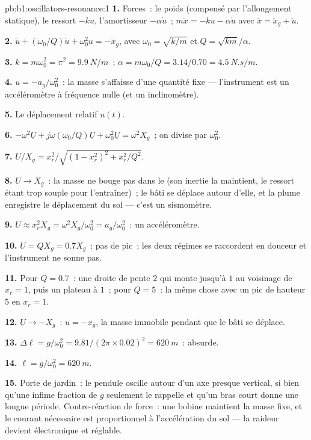 \begin{solution}{pb:b1:oscillators-resonance:1}
\textbf{1.} Forces~: le poids (compensé par l'allongement statique), le
ressort $-ku$, l'amortisseur $-\alpha\dot u$~; $m\ddot x = -ku - \alpha\dot u$ avec $\ddot x =
\ddot x_g + \ddot u$.

\textbf{2.} $\ddot u + (\omega_0/Q)\dot u + \omega_0^2u = -\ddot x_g$, avec $\omega_0 =
\sqrt{k/m}$ et $Q = \sqrt{km}/\alpha$.

\textbf{3.} $k = m\omega_0^2 = \pi^2 = \qty{9.9}{N/m}$~; $\alpha = m\omega_0/Q =
3.14/0.70 = \qty{4.5}{N.s/m}$.

\textbf{4.} $u = -a_g/\omega_0^2$~: la masse s'affaisse d'une quantité fixe
--- l'instrument est un accéléromètre à fréquence nulle (et un inclinomètre).

\textbf{5.} Le déplacement relatif $u(t)$.

\textbf{6.} $-\omega^2\underline U + j\omega(\omega_0/Q)\underline U + \omega_0^2\underline U
= \omega^2X_g$~; on divise par $\omega_0^2$.

\textbf{7.} $U/X_g = x_r^2/\sqrt{(1 - x_r^2)^2 + x_r^2/Q^2}$.

\textbf{8.} $U \to X_g$~: la masse ne bouge pas dans le  (son inertie la maintient, le ressort étant trop souple pour
l'entraîner)~; le bâti se déplace autour d'elle, et la plume enregistre
le déplacement du sol --- c'est un sismomètre.

\textbf{9.} $U \approx x_r^2X_g = \omega^2X_g/\omega_0^2 = a_g/\omega_0^2$~: un
accéléromètre.

\textbf{10.} $U = QX_g = 0.7X_g$~: pas de pic~; les deux régimes se
raccordent en douceur et l'instrument ne sonne pas.

\textbf{11.} Pour $Q = 0.7$~: une droite de pente $2$ qui monte jusqu'à
$1$ au voisinage de $x_r = 1$, puis un plateau à $1$~; pour $Q = 5$~: la
même chose avec un pic de hauteur $5$ en $x_r = 1$.

\textbf{12.} $\underline U \to -X_g$~: $u = -x_g$, la masse immobile
pendant que le bâti se déplace.

\textbf{13.} $\Delta\ell = g/\omega_0^2 = 9.81/(2\pi \times 0.02)^2 = \qty{620}{m}$~:
absurde.

\textbf{14.} $\ell = g/\omega_0^2 = \qty{620}{m}$.

\textbf{15.} Porte de jardin~: le pendule oscille autour d'un axe presque
vertical, si bien qu'une infime fraction de $g$ seulement le rappelle et
qu'un bras court donne une longue période. Contre-réaction de force~: une
bobine maintient la masse fixe, et le courant nécessaire est
proportionnel à l'accélération du sol --- la raideur devient
électronique et réglable.


\end{solution}
